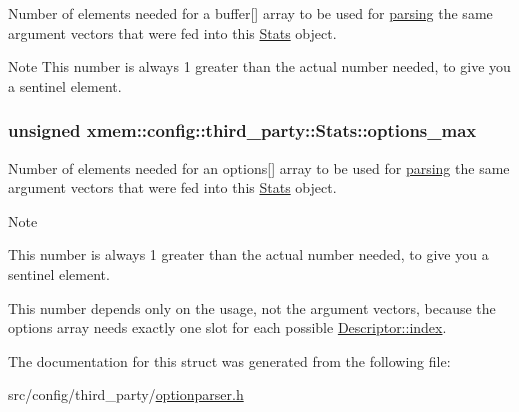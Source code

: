 Number of elements needed for a {\ttfamily buffer}\mbox{[}\mbox{]} array to be used for \hyperlink{classxmem_1_1config_1_1third__party_1_1_parser_a0e45d97675bc5d003ef6f68ac8cd7249}{parsing} the same argument vectors that were fed into this \hyperlink{structxmem_1_1config_1_1third__party_1_1_stats}{Stats} object. 

\begin{DoxyNote}{Note}
This number is always 1 greater than the actual number needed, to give you a sentinel element. 
\end{DoxyNote}
\hypertarget{structxmem_1_1config_1_1third__party_1_1_stats_a74f645c06ae7eab5058f2a51226c2dcd}{}
\subsubsection[{options\+\_\+max}]{\setlength{\rightskip}{0pt plus 5cm}unsigned xmem\+::config\+::third\+\_\+party\+::\+Stats\+::options\+\_\+max}\label{structxmem_1_1config_1_1third__party_1_1_stats_a74f645c06ae7eab5058f2a51226c2dcd}


Number of elements needed for an {\ttfamily options}\mbox{[}\mbox{]} array to be used for \hyperlink{classxmem_1_1config_1_1third__party_1_1_parser_a0e45d97675bc5d003ef6f68ac8cd7249}{parsing} the same argument vectors that were fed into this \hyperlink{structxmem_1_1config_1_1third__party_1_1_stats}{Stats} object. 

\begin{DoxyNote}{Note}
\begin{DoxyItemize}
\item This number is always 1 greater than the actual number needed, to give you a sentinel element. \item This number depends only on the {\ttfamily usage}, not the argument vectors, because the {\ttfamily options} array needs exactly one slot for each possible \hyperlink{structxmem_1_1config_1_1third__party_1_1_descriptor_aacf3d44f35c61f22be65da078f60734b}{Descriptor\+::index}. \end{DoxyItemize}

\end{DoxyNote}


The documentation for this struct was generated from the following file\+:\begin{DoxyCompactItemize}
\item 
src/config/third\+\_\+party/\hyperlink{optionparser_8h}{optionparser.\+h}\end{DoxyCompactItemize}
